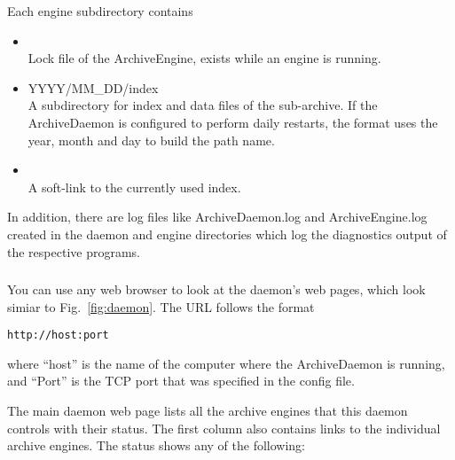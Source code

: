 \noindent Each engine subdirectory contains
\begin{itemize}
\item {}\\
  Lock file of the ArchiveEngine, exists while an engine is running.
\item YYYY/MM\_DD/index \\
  A subdirectory for index and data files of the sub-archive.  If the
  ArchiveDaemon is configured to perform daily restarts, the format
  uses the year, month and day to build the path name.
\item {} \\
  A soft-link to the currently used index.
\end{itemize}

In addition, there are log files like ArchiveDaemon.log and
ArchiveEngine.log created in the daemon and engine directories which
log the diagnostics output of the respective programs.

\subsubsection{} \label{sec:daemonserver}
You can use any web browser to look at the daemon's web pages,
which look simiar to Fig.~\ref{fig:daemon}.
The URL follows the format
\begin{lstlisting}[keywordstyle=\sffamily]
    http://host:port
\end{lstlisting}
\noindent where ``host'' is the name of the computer where the
ArchiveDaemon is running, and ``Port'' is the TCP port that was
specified in the config file.

The main daemon web page lists all the archive engines that this
daemon controls with their status. The first column also contains
links to the individual archive engines. The status shows any of the
following:

